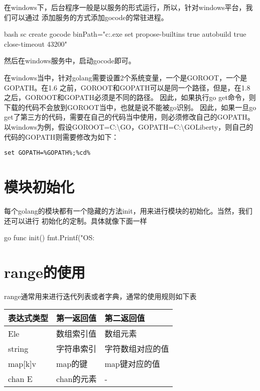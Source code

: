 在windows下，后台程序一般是以服务的形式运行，所以，针对windows平台，我们可以通过
添加服务的方式添加gocode的常驻进程。
\begin{code-block}{bash}
sc create gocode binPath="c:\go\bin\gocode.exe set propose-builtins true autobuild true close-timeout 43200"
\end{code-block}
然后在windows服务中，启动gocode即可。

\begin{attention}
在windows当中，针对golang需要设置2个系统变量，一个是GOROOT，一个是GOPATH。在1.6
之前，GOROOT和GOPATH可以是同一个路径，但是，在1.8之后，GOROOT和GOPATH必须是不同的路径。
因此，如果执行go get命令，则下载的代码不会放到GOROOT当中，也就是说不能被go识别。
因此，如果一旦go get了第三方的代码，需要在自己的代码当中使用，则必须修改自己的GOPATH。
以windows为例，假设GOROOT=C:\textbackslash GO，GOPATH=C:\textbackslash GOLiberty，则自己的代码的GOPATH则需要修改为如下：
\begin{mdframed}[topline=false, bottomline=false, leftline=false, rightline=false, backgroundcolor=lbcolor]
\begin{verbatim}
set GOPATH=%GOPATH%;%cd%
\end{verbatim}
\end{mdframed}
\end{attention}

\section{模块初始化}
每个golang的模块都有一个隐藏的方法init，用来进行模块的初始化。当然，我们还可以进行
初始化的定制。具体就像下面一样
\begin{code-block}{go}
func init() {
    fmt.Printf("OS: %
}
\end{code-block}

\section{range的使用}
range通常用来进行迭代列表或者字典，通常的使用规则如下表
\begin{center}
  \begin{tabularx}{\textwidth}{|X|X|X|}
  \hline
  表达式类型& 第一返回值& 第二返回值\\ \hline
  [n]Ele& 数组索引值& 数组元素 \\
  string& 字符串索引& 字符数组对应的值\\
  map[k]v& map的键 & map键对应的值\\
  chan E & chan的元素 & - \\ \hline
  \end{tabularx}
  \label{tab:usage_of_range}
\end{center}

